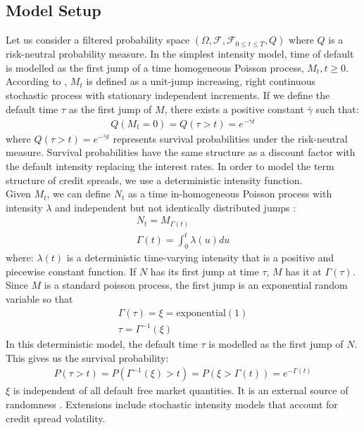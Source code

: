 \documentclass[11t,a4paper]{article}
\begin{document}
\subsection{Model Setup}
Let us consider a filtered probability space $(\Omega, \mathcal{F}, \mathcal{F}_{0\leq{t}\leq{T}}, Q)$ where $Q$ is a risk-neutral probability measure. In the simplest intensity model, time of default is modelled as the first jump of a time homogeneous Poisson process, ${M_t, t\geq 0}$. According to \cite{Brigobook}, $M_t$ is defined as a unit-jump increasing, right continuous stochastic process with stationary independent increments. If we define the default time $\tau$ as the first jump of $M$, there exists a positive constant $\bar{\gamma}$ such that:
\begin{align}Q(M_t=0)=Q(\tau> t)=e^{-\bar{\gamma}t}\end{align}
where $Q(\tau > t)=e^{-\bar{\gamma}t}$ represents survival probabilities under the risk-neutral measure. Survival probabilities have the same structure as a discount factor with the default intensity replacing the interest rates. In order to model the term structure of credit spreads, we use a deterministic intensity function.\\
Given $M_t$, we can define $N_t$ as a time in-homogeneous Poisson process with intensity $\lambda$ and independent but not identically distributed jumps \cite{intlecnotes}:
\begin{gather}
 N_t = M_{\Gamma(t)} \\
 \Gamma(t) = \int_{0}^{t}\lambda(u) du
 \end{gather}
where:
$\lambda(t)$ is a deterministic time-varying intensity that is a positive and piecewise constant function. 
If $N$ has its first jump at time $\tau$, $M$ has it at $\Gamma(\tau)$. 
Since $M$ is a standard poisson process, the first jump is an exponential random variable so that 
\begin{gather}
\Gamma(\tau) = \xi = \text{exponential}(1) \\
\tau = \Gamma^{-1}(\xi)
\end{gather}
In this deterministic model, the default time $\tau$ is modelled as the first jump of $N$. This gives us the survival probability:
\begin{align} P(\tau > t) = P(\Gamma^{-1}(\xi) >t) = P(\xi > \Gamma(t)) = e^{-\Gamma(t)} \end{align}
$\xi$ is independent of all default free market quantities. It is an external source of randomness \cite{intlecnotes}. Extensions include stochastic intensity models that account for credit spread volatility.\\
\end{document}
